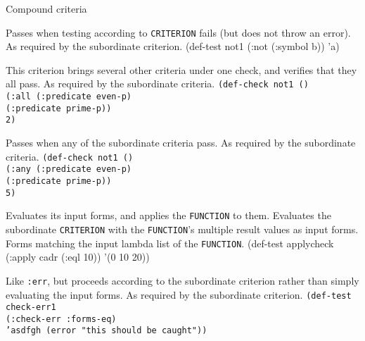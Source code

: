\begin{criteriaGroup}{Compound criteria}{}

{Passes when testing according to \texttt{CRITERION} fails (but
does not throw an error).}
{As required by the subordinate criterion.}
{\noExpl}
{\singleEx}{(def-test not1 (:not (:symbol b)) 'a)}

{This criterion brings several other criteria under one check, and
verifies that they all pass.}
{As required by the subordinate criteria.}
{\noExpl}
{\tabbingEx}{\texttt{(de}\=\texttt{f-}\=\texttt{check not1 ()}
\\ \>\>\texttt{(:all }\=\texttt{(:predicate even-p)}
\\ \>\>\>\texttt{(:predicate prime-p))}
\\ \>\texttt{2)}}

{Passes when any of the subordinate criteria pass.}
{As required by the subordinate criteria.}
{\noExpl}
{\tabbingEx}{
\texttt{(de}\=\texttt{f-}\=\texttt{check not1 ()}
\\ \>\>\texttt{(:any }\=\texttt{(:predicate even-p)}
\\ \>\>\>\texttt{(:predicate prime-p))}
\\ \>\texttt{5)}}

{Evaluates its input forms, and applies the \texttt{FUNCTION} to them.
Evaluates the subordinate \texttt{CRITERION} with the
\texttt{FUNCTION}'s multiple result values as input forms.}
{Forms matching the input lambda list of the \texttt{FUNCTION}.}
{\noExpl}
{\singleEx}{(def-test applycheck (:apply cadr (:eql 10)) '(0 10 20))}

{Like \texttt{:err}, but proceeds according to the subordinate
criterion rather than simply evaluating the input forms.}
{As required by the subordinate criterion.}
{}
{\tabbingEx}
{\texttt{(de}\=\texttt{f-}\=\texttt{test check-err1}
\\ \> \> \texttt{(:check-err :forms-eq)}
\\ \> \texttt{'asdfgh (error "this should be caught"))}}


\end{criteriaGroup}
